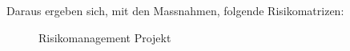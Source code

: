 \begin{flushleft}
    \clearpage
    \recalctypearea
    Daraus ergeben sich, mit den Massnahmen, folgende Risikomatrizen:
    \begin{figure}[H]
        \centering
        \qquad
        \caption{Risikomanagement Projekt}
        \label{fig:riskmanagement_projekct}
    \end{figure}
\end{flushleft}
